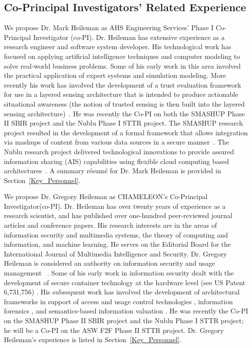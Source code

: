 \documentclass{sbir}
\begin{document}
\subsection{Co-Principal Investigators' Related Experience}
We propose Dr. Mark Heileman as AHS Engineering Services' Phase I Co-Principal Investigator (co-PI). Dr. Heileman has extensive experience as a research engineer and software system developer. His technological work has focused on applying artificial intelligence techniques and computer modeling to solve real-world business problems. Some of his early work in this area involved the practical application of expert systems and simulation modeling. More recently his work has involved the development of a trust evaluation framework for use in a layered sensing architecture that is intended to produce actionable situational awareness (the notion of trusted sensing is then built into the layered sensing architecture)~\cite{HeHeFiSt:09,HeHeHw:09}. He was recently the Co-PI on both the SMASHUP Phase II SBIR project and the Nublu Phase I STTR project. The SMASHUP research project resulted in the development of a formal framework that allows integration via mashups of content from various data sources in a secure manner~\cite{HeHeGiEv:10,HeHeShGiJa:11}. The Nublu research project delivered technological innovations to provide assured information sharing (AIS) capabilities using flexible cloud computing based architectures~\cite{HeHeNaLa:12}. A summary r\'esum\'e for Dr. Mark Heileman is provided in Section~\ref{Key_Personnel}.

We propose Dr. Gregory Heileman as CHAMELEON's Co-Principal Investigator(co-PI). Dr. Heileman has over twenty years of experience as a research scientist, and has published over one-hundred peer-reviewed journal articles and conference papers. His research interests are in the areas of information security and multimedia systems, the theory of computing and information, and machine learning. He serves on the Editorial Board for the International Journal of Multimedia Intelligence and Security. Dr. Gregory Heileman is considered an authority on information security and usage management ~\cite{Informatics}. Some of his early work in information security dealt with the development of secure container technology at the hardware level (see US Patent 6,731,756) \cite{PiHe:04}. His subsequent work has involved the development of architectural frameworks in support of access and usage control technologies \cite{HeJa:05,HeJaKhHr:07,JaHe:04,JaHeMa:06}, information forensics \cite{PeHeAb:07,QuPeHe:09}, and semantics-based information valuation \cite{AlHe:10,AlHe:08}. He was recently the Co-PI on the SMASHUP Phase II SBIR project and the Nublu Phase I STTR project; he will be a Co-PI on the ASW F2F Phase II STTR project. Dr. Gregory Heileman's experience is listed in Section~\ref{Key_Personnel}.
\end{document}
